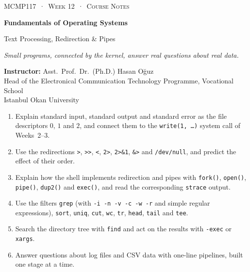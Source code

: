 \documentclass[11pt,a4paper]{article}
\newcommand{\cmd}[1]{\texttt{#1}}
\begin{document}
\setlength{\emergencystretch}{3em}
\thispagestyle{empty}
\begin{tcolorbox}[enhanced,colback=dark,colframe=dark,arc=0pt,boxrule=0pt,
  left=18pt,right=18pt,top=20pt,bottom=20pt,coltext=white]
{\small\color{mint}\textsc{MCMP117 \,·\, Week 12 \,·\, Course Notes}}\par\medskip
{\headfont\fontsize{26}{30}\selectfont\bfseries Fundamentals of Operating Systems}\par\medskip
{\large Text Processing, Redirection \& Pipes}\par\smallskip
{\small\itshape\color{white!70} Small programs, connected by the kernel, answer real questions about real data.}
\end{tcolorbox}

\vspace{0.4em}
{\small
\textbf{Instructor:} Asst.\ Prof.\ Dr.\ (Ph.D.) Hasan Oğuz\\
Head of the Electronical Communication Technology Programme, Vocational School\\
Istanbul Okan University\par}

\vspace{0.8em}
\begin{keyidea}
\begin{enumerate}[leftmargin=1.4em]
  \item Explain standard input, standard output and standard error as the file descriptors $0$, $1$ and $2$, and connect them to the \cmd{write(1, \dots)} system call of Weeks~2--3.
  \item Use the redirections \cmd{>}, \cmd{>>}, \cmd{<}, \cmd{2>}, \cmd{2>\&1}, \cmd{\&>} and \cmd{/dev/null}, and predict the effect of their order.
  \item Explain how the shell implements redirection and pipes with \cmd{fork()}, \cmd{open()}, \cmd{pipe()}, \cmd{dup2()} and \cmd{exec()}, and read the corresponding \cmd{strace} output.
  \item Use the filters \cmd{grep} (with \cmd{-i -n -v -c -w -r} and simple regular expressions), \cmd{sort}, \cmd{uniq}, \cmd{cut}, \cmd{wc}, \cmd{tr}, \cmd{head}, \cmd{tail} and \cmd{tee}.
  \item Search the directory tree with \cmd{find} and act on the results with \cmd{-exec} or \cmd{xargs}.
  \item Answer questions about log files and CSV data with one-line pipelines, built one stage at a time.
\end{enumerate}
\end{keyidea}
\end{document}
